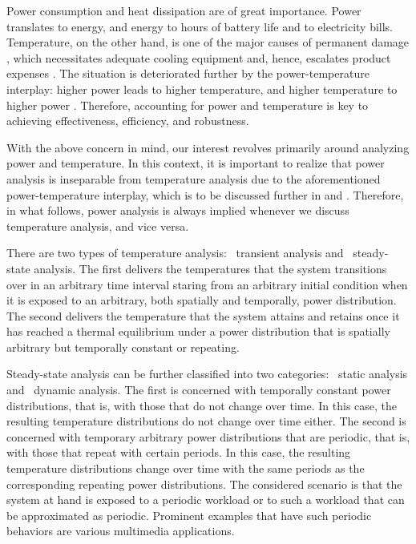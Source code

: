 Power consumption and heat dissipation are of great importance. Power translates
to energy, and energy to hours of battery life and to electricity bills.
Temperature, on the other hand, is one of the major causes of permanent damage
\cite{jedec2016}, which necessitates adequate cooling equipment and, hence,
escalates product expenses \cite{chaudhry2015}. The situation is deteriorated
further by the power-temperature interplay: higher power leads to higher
temperature, and higher temperature to higher power \cite{liu2007}. Therefore,
accounting for power and temperature is key to achieving effectiveness,
efficiency, and robustness.

With the above concern in mind, our interest revolves primarily around analyzing
power and temperature. In this context, it is important to realize that power
analysis is inseparable from temperature analysis due to the aforementioned
power-temperature interplay, which is to be discussed further in
 and . Therefore, in what
follows, power analysis is always implied whenever we discuss temperature
analysis, and vice versa.

There are two types of temperature analysis: \one~transient analysis and
\two~steady-state analysis. The first delivers the temperatures that the system
transitions over in an arbitrary time interval staring from an arbitrary initial
condition when it is exposed to an arbitrary, both spatially and temporally,
power distribution. The second delivers the temperature that the system attains
and retains once it has reached a thermal equilibrium under a power distribution
that is spatially arbitrary but temporally constant or repeating.

Steady-state analysis can be further classified into two categories: \one~static
analysis and \two~dynamic analysis. The first is concerned with temporally
constant power distributions, that is, with those that do not change over time.
In this case, the resulting temperature distributions do not change over time
either. The second is concerned with temporary arbitrary power distributions
that are periodic, that is, with those that repeat with certain periods. In this
case, the resulting temperature distributions change over time with the same
periods as the corresponding repeating power distributions. The considered
scenario is that the system at hand is exposed to a periodic workload or to such
a workload that can be approximated as periodic. Prominent examples that have
such periodic behaviors are various multimedia applications.

